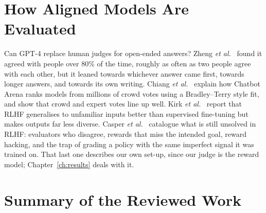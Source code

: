 \section{How Aligned Models Are Evaluated}
\label{sec:lit-eval}
Can GPT-4 replace human judges for open-ended answers? Zheng \emph{et al.}~\cite{zheng2023judging} found it agreed with people over 80\% of the time, roughly as often as two people agree with each other, but it leaned towards whichever answer came first, towards longer answers, and towards its own writing. Chiang \emph{et al.}~\cite{chiang2024arena} explain how Chatbot Arena ranks models from millions of crowd votes using a Bradley--Terry style fit, and show that crowd and expert votes line up well. Kirk \emph{et al.}~\cite{kirk2024understanding} report that RLHF generalises to unfamiliar inputs better than supervised fine-tuning but makes outputs far less diverse. Casper \emph{et al.}~\cite{casper2023open} catalogue what is still unsolved in RLHF: evaluators who disagree, rewards that miss the intended goal, reward hacking, and the trap of grading a policy with the same imperfect signal it was trained on. That last one describes our own set-up, since our judge is the reward model; Chapter~\ref{ch:results} deals with it.

\section{Summary of the Reviewed Work}
\label{sec:lit-summary}

